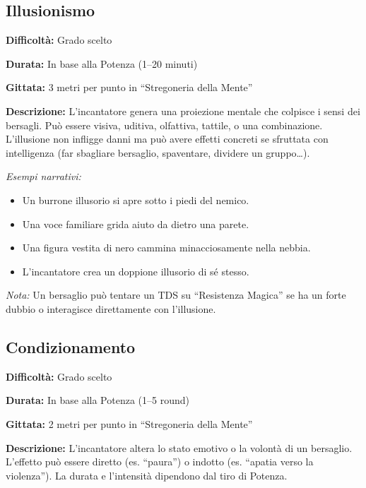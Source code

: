 \documentclass[./magie.tex]{subfiles}
\begin{document}
\subsection*{Illusionismo}
\begin{description}
\item \textbf{Difficoltà:} Grado scelto
\item \textbf{Durata:} In base alla Potenza (1–20 minuti)
\item \textbf{Gittata:} 3 metri per punto in “Stregoneria della Mente”
\item \textbf{Descrizione:} L’incantatore genera una proiezione mentale che colpisce i sensi dei bersagli. Può essere visiva, uditiva, olfattiva, tattile, o una combinazione. L’illusione non infligge danni ma può avere effetti concreti se sfruttata con intelligenza (far sbagliare bersaglio, spaventare, dividere un gruppo…).
\end{description}

\textit{Esempi narrativi:}
\begin{itemize}
\item Un burrone illusorio si apre sotto i piedi del nemico.
\item Una voce familiare grida aiuto da dietro una parete.
\item Una figura vestita di nero cammina minacciosamente nella nebbia.
\item L’incantatore crea un doppione illusorio di sé stesso.
\end{itemize}

\textit{Nota:} Un bersaglio può tentare un TDS su “Resistenza Magica” se ha un forte dubbio o interagisce direttamente con l’illusione.

\clearpage
\subsection*{Condizionamento}
\begin{description}
\item \textbf{Difficoltà:} Grado scelto
\item \textbf{Durata:} In base alla Potenza (1–5 round)
\item \textbf{Gittata:} 2 metri per punto in “Stregoneria della Mente”
\item \textbf{Descrizione:} L’incantatore altera lo stato emotivo o la volontà di un bersaglio. L’effetto può essere diretto (es. “paura”) o indotto (es. “apatia verso la violenza”). La durata e l’intensità dipendono dal tiro di Potenza.
\end{description}
\end{document}
